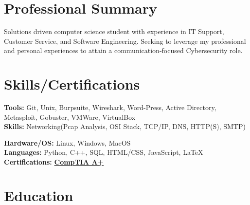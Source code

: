\documentclass[a4paper]{Resume}
\begin{document}


\descript{}
\begin{onehalfspace} 
\section{Professional Summary}
\hrulefill

Solutions driven computer science student with experience in IT Support, Customer Service, and Software Engineering. Seeking to leverage my professional and personal experiences to attain a communication-focused Cybersecurity role.   
\sectionsep


\section{Skills/Certifications} 
\hrulefill


\pt \textbf{Tools:} Git, Unix, Burpsuite, Wireshark, Word-Press, Active Directory, Metasploit, Gobuster, VMWare, VirtualBox \\
\pt \textbf{Skills:} Networking(Pcap Analysis, OSI Stack, TCP/IP, DNS, HTTP(S), SMTP) 

\pt \textbf{Hardware/OS:}  Linux, Windows, MacOS  \\

\pt \textbf{Languages:}  Python, C++, SQL, HTML/CSS, JavaScript, \LaTeX \\

\pt \textbf{Certifications:} \href{https://www.udemy.com/certificate/UC-98f894dc-4e81-4be3-aeb9-21b391568400/}{\textbf{CompTIA A+}} \\
\sectionsep

\section{Education}
\hrulefill


\end{onehalfspace}
\end{document}
